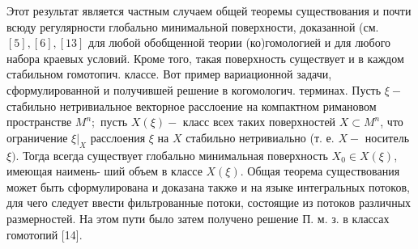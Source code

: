 \documentclass[10pt]{article}
\begin{document}
Этот результат является частным случаем общей теоремы существования и почти всюду регулярности глобально минимальной поверхности, доказанной (см. $[5],[6],[13]$ для любой обобщенной теории (ко)гомологией и для любого набора краевых условий. Кроме того, такая поверхность существует и в каждом стабильном гомотопич. классе. Вот пример вариационной задачи, сформулированной и получившей решение в когомологич. терминах. Пусть $\xi-$ стабильно нетривиальное векторное расслоение на компактном римановом пространстве $M^{n} ;$ пусть $X(\xi)-$ класс всех таких поверхностей $X \subset M^{n}$, что ограничение $\left.\xi\right|_{X}$ расслоения $\xi$ на $X$ стабильно нетривиально (т. е. $X-$ носитель $\xi)$. Тогда всегда существует глобально минимальная поверхность $X_{0} \in X(\xi)$, имеющая наимень- ший объем в классе $X(\xi)$. Общая теорема существования может быть сформулирована и доказана такжө и на языке интегральных потоков, для чего следует ввести фильтрованные потоки, состоящие из потоков различных размерностей. На этом пути было затем получено решение П. м. з. в классах гомотопий [14].
\end{document}
